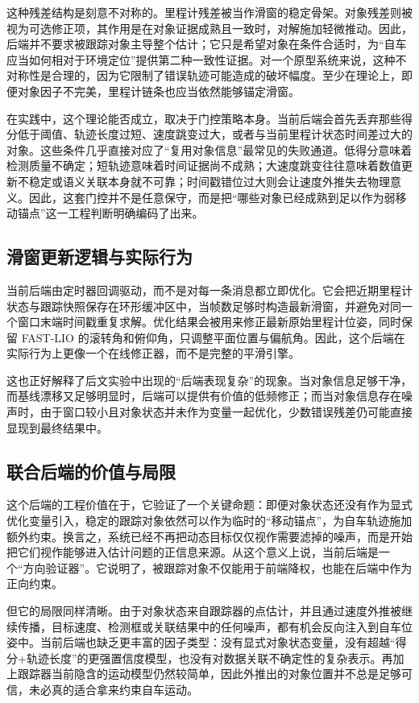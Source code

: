 \documentclass[utf8, a4paper, 12pt]{ctexart}
\begin{document}
这种残差结构是刻意不对称的。里程计残差被当作滑窗的稳定骨架。对象残差则被视为可选修正项，其作用是在对象证据成熟且一致时，对解施加轻微推动。因此，后端并不要求被跟踪对象主导整个估计；它只是希望对象在条件合适时，为“自车应当如何相对于环境定位”提供第二种一致性证据。对一个原型系统来说，这种不对称性是合理的，因为它限制了错误轨迹可能造成的破坏幅度。至少在理论上，即便对象因子不完美，里程计链条也应当依然能够锚定滑窗。

在实践中，这个理论能否成立，取决于门控策略本身。当前后端会首先丢弃那些得分低于阈值、轨迹长度过短、速度跳变过大，或者与当前里程计状态时间差过大的对象。这些条件几乎直接对应了“复用对象信息”最常见的失败通道。低得分意味着检测质量不确定；短轨迹意味着时间证据尚不成熟；大速度跳变往往意味着数值更新不稳定或语义关联本身就不可靠；时间戳错位过大则会让速度外推失去物理意义。因此，这套门控并不是任意保守，而是把“哪些对象已经成熟到足以作为弱移动锚点”这一工程判断明确编码了出来。

\subsection{滑窗更新逻辑与实际行为}
当前后端由定时器回调驱动，而不是对每一条消息都立即优化。它会把近期里程计状态与跟踪快照保存在环形缓冲区中，当帧数足够时构造最新滑窗，并避免对同一个窗口末端时间戳重复求解。优化结果会被用来修正最新原始里程计位姿，同时保留 FAST-LIO 的滚转角和俯仰角，只调整平面位置与偏航角。因此，这个后端在实际行为上更像一个在线修正器，而不是完整的平滑引擎。

这也正好解释了后文实验中出现的“后端表现复杂”的现象。当对象信息足够干净，而基线漂移又足够明显时，后端可以提供有价值的低频修正；而当对象信息存在噪声时，由于窗口较小且对象状态并未作为变量一起优化，少数错误残差仍可能直接显现到最终结果中。

\subsection{联合后端的价值与局限}
这个后端的工程价值在于，它验证了一个关键命题：即便对象状态还没有作为显式优化变量引入，稳定的跟踪对象依然可以作为临时的“移动锚点”，为自车轨迹施加额外约束。换言之，系统已经不再把动态目标仅仅视作需要滤掉的噪声，而是开始把它们视作能够进入估计问题的正信息来源。从这个意义上说，当前后端是一个“方向验证器”。它说明了，被跟踪对象不仅能用于前端降权，也能在后端中作为正向约束。

但它的局限同样清晰。由于对象状态来自跟踪器的点估计，并且通过速度外推被继续传播，目标速度、检测框或关联结果中的任何噪声，都有机会反向注入到自车位姿中。当前后端也缺乏更丰富的因子类型：没有显式对象状态变量，没有超越“得分+轨迹长度”的更强置信度模型，也没有对数据关联不确定性的复杂表示。再加上跟踪器当前隐含的运动模型仍然较简单，因此外推出的对象位置并不总是足够可信，未必真的适合拿来约束自车运动。
\end{document}
